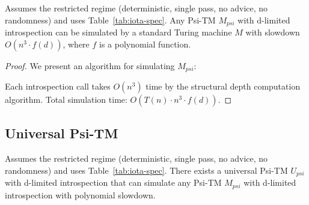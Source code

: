 \begin{theorem}
Assumes the restricted regime (deterministic, single pass, no advice, no randomness) and uses Table~\ref{tab:iota-spec}.
Any Psi-TM $M_{psi}$ with d-limited introspection can be simulated by a standard Turing machine $M$ with slowdown $O(n^3 \cdot f(d))$, where $f$ is a polynomial function.
\end{theorem}

\begin{proof}
We present an algorithm for simulating $M_{psi}$:

\begin{figure}[ht]
\centering
{}
\end{figure}

Each introspection call takes $O(n^3)$ time by the structural depth computation algorithm. Total simulation time: $O(T(n) \cdot n^3 \cdot f(d))$.
\end{proof}

\subsection{Universal Psi-TM}

\begin{theorem}
Assumes the restricted regime (deterministic, single pass, no advice, no randomness) and uses Table~\ref{tab:iota-spec}.
There exists a universal Psi-TM $U_{psi}$ with d-limited introspection that can simulate any Psi-TM $M_{psi}$ with d-limited introspection with polynomial slowdown.
\end{theorem}

